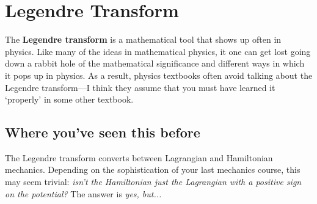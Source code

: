 \section{Legendre Transform}
\label{app:Legendre}

The \textbf{Legendre transform} is a mathematical tool that shows up often in physics. Like many of the ideas in mathematical physics, it one can get lost going down a rabbit hole of the mathematical significance and different ways in which it pops up in physics. As a result, physics textbooks often avoid talking about the Legendre transform---I think they assume that you must have learned it `properly' in some other textbook.

\subsection{Where you've seen this before}

The Legendre transform converts between Lagrangian and Hamiltonian mechanics. Depending on the sophistication of your last mechanics course, this may seem trivial: \emph{isn't the Hamiltonian just the Lagrangian with a positive sign on the potential?} The answer is \emph{yes, but...}

